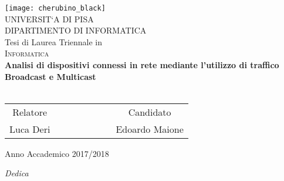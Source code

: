 \clearpage{\pagestyle{empty}\cleardoublepage}


\begin{titlepage}
 \begin{center}
     \texttt{[image: cherubino\_black]}\\
     \vspace{1em}
     {\Large \textsc{UNIVERSIT`A DI PISA}}\\
     \vspace{1em}
     {\Large \textsc{DIPARTIMENTO DI INFORMATICA}}\\
     \vspace{2em}
     {\normalsize Tesi di Laurea Triennale in}\\
     \vspace{1em}
     {\Large \textsc{Informatica}}\\
     \vspace{5em}
     {\LARGE \textbf{Analisi di dispositivi connessi in rete mediante l'utilizzo di traffico \\Broadcast e Multicast}}\\
     \vspace{1em}
     {\LARGE \textbf{}}\\
 \end{center}

\vskip 2.5cm
  \begin{center}
    \begin{tabular}{c c c c c c c c}
      Relatore & & & & & & & Candidato \\[0.2cm]
      \large{Luca Deri} & & & & & & & \large{Edoardo Maione}\\[0.4cm]
    \end{tabular}
  \end{center}

\vskip 2cm
\begin{center}
{\normalsize Anno Accademico 2017/2018}
\end{center}
\end{titlepage}

\clearpage{\pagestyle{empty}\cleardoublepage}


\vspace{5em}
\begin{flushright}
{\Large \textit{Dedica}}
\end{flushright}

\clearpage{\pagestyle{empty}\cleardoublepage}
